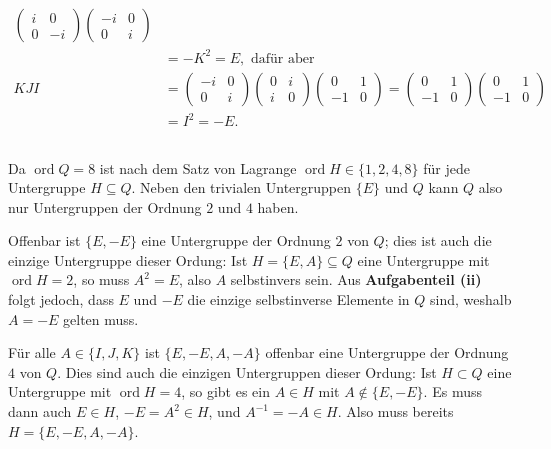 \documentclass[a4paper,10pt]{article}
\theoremstyle{definition}
\newcommand{\ord}{\operatorname{ord}}
\begin{document}
\begin{align*}
\begin{pmatrix}
  i &  0\\
  0 & -i
 \end{pmatrix}
 \begin{pmatrix}
  -i & 0\\
   0 & i
 \end{pmatrix}\\
 &= -K^2 = E, \text{ dafür aber} \\
 KJI
 &=
 \begin{pmatrix}
  -i & 0\\
   0 & i
 \end{pmatrix}
 \begin{pmatrix}
  0 & i\\
  i & 0
 \end{pmatrix}
 \begin{pmatrix}
   0 & 1\\
  -1 & 0
 \end{pmatrix}
 =
 \begin{pmatrix}
   0 & 1\\
  -1 & 0
 \end{pmatrix}
 \begin{pmatrix}
   0 & 1\\
  -1 & 0
 \end{pmatrix} \\
 &= I^2 = -E.
\end{align*}


\subsection{}
Da $\ord Q = 8$ ist nach dem Satz von Lagrange $\ord H \in \{1,2,4,8\}$ für jede Untergruppe $H \subseteq Q$. Neben den trivialen Untergruppen $\{E\}$ und $Q$ kann $Q$ also nur Untergruppen der Ordnung $2$ und $4$ haben.

Offenbar ist $\{E,-E\}$ eine Untergruppe der Ordnung $2$ von $Q$; dies ist auch die einzige Untergruppe dieser Ordung: Ist $H = \{E, A\} \subseteq Q$ eine Untergruppe mit $\ord H = 2$, so muss $A^2 = E$, also $A$ selbstinvers sein. Aus \textbf{Aufgabenteil (ii)} folgt jedoch, dass $E$ und $-E$ die einzige selbstinverse Elemente in $Q$ sind, weshalb $A = -E$ gelten muss.

Für alle $A \in \{I,J,K\}$ ist $\{E,-E,A,-A\}$ offenbar eine Untergruppe der Ordnung $4$ von $Q$. Dies sind auch die einzigen Untergruppen dieser Ordung: Ist $H \subset Q$ eine Untergruppe mit $\ord H = 4$, so gibt es ein $A \in H$ mit $A \not \in \{E,-E\}$. Es muss dann auch $E \in H$, $-E = A^2 \in H$, und $A^{-1} = -A \in H$. Also muss bereits $H = \{E,-E,A,-A\}$.
\end{document}
